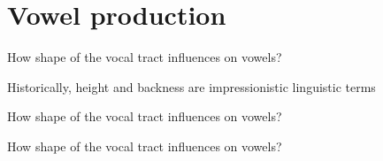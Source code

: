 \section{Vowel production}
\begin{frame}{How shape of the vocal tract influences on vowels?}
\Large
\vfill
\begin{center}
\begin{vowel}
\end{vowel}
\end{center}
\vfill
\normalsize
Historically, height and backness are impressionistic linguistic terms
\end{frame}

\begin{frame}{How shape of the vocal tract influences on vowels?}
\Large
\vfill
\begin{center}
\begin{vowel}
\end{vowel}
\end{center}
\vfill
\end{frame}

\begin{frame}{How shape of the vocal tract influences on vowels?}
\Large
\vfill
\begin{center}
\begin{vowel}
\end{vowel}
\end{center}
\vfill
\end{frame}

